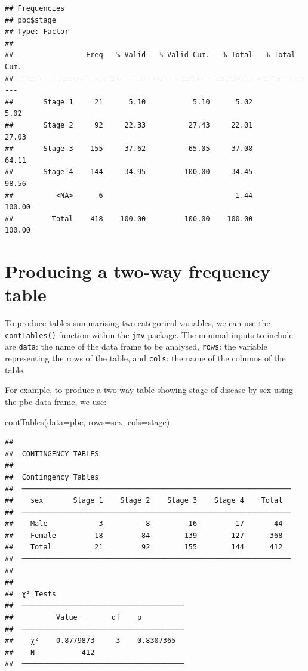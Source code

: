 \documentclass[
]{memoir}
\newenvironment{Shaded}{\begin{snugshade}}{\end{snugshade}}
\newcommand{\AttributeTok}[1]{\textcolor[rgb]{0.77,0.63,0.00}{#1}}
\newcommand{\FunctionTok}[1]{\textcolor[rgb]{0.00,0.00,0.00}{#1}}
\newcommand{\NormalTok}[1]{#1}
\begin{document}
\begin{verbatim}
## Frequencies  
## pbc$stage  
## Type: Factor  
## 
##                 Freq   % Valid   % Valid Cum.   % Total   % Total Cum.
## ------------- ------ --------- -------------- --------- --------------
##       Stage 1     21      5.10           5.10      5.02           5.02
##       Stage 2     92     22.33          27.43     22.01          27.03
##       Stage 3    155     37.62          65.05     37.08          64.11
##       Stage 4    144     34.95         100.00     34.45          98.56
##          <NA>      6                               1.44         100.00
##         Total    418    100.00         100.00    100.00         100.00
\end{verbatim}

\hypertarget{producing-a-two-way-frequency-table}{%
\section{Producing a two-way frequency table}\label{producing-a-two-way-frequency-table}}

To produce tables summarising two categorical variables, we can use the \texttt{contTables()} function within the \texttt{jmv} package. The minimal inputs to include are \texttt{data}: the name of the data frame to be analysed, \texttt{rows}: the variable representing the rows of the table, and \texttt{cols}: the name of the columns of the table.

For example, to produce a two-way table showing stage of disease by sex using the pbc data frame, we use:

\begin{Shaded}
\begin{Highlighting}[]
\FunctionTok{contTables}\NormalTok{(}\AttributeTok{data=}\NormalTok{pbc, }\AttributeTok{rows=}\NormalTok{sex, }\AttributeTok{cols=}\NormalTok{stage)}
\end{Highlighting}
\end{Shaded}

\begin{verbatim}
## 
##  CONTINGENCY TABLES
## 
##  Contingency Tables                                              
##  ─────────────────────────────────────────────────────────────── 
##    sex       Stage 1    Stage 2    Stage 3    Stage 4    Total   
##  ─────────────────────────────────────────────────────────────── 
##    Male            3          8         16         17       44   
##    Female         18         84        139        127      368   
##    Total          21         92        155        144      412   
##  ─────────────────────────────────────────────────────────────── 
## 
## 
##  χ² Tests                               
##  ────────────────────────────────────── 
##          Value        df    p           
##  ────────────────────────────────────── 
##    χ²    0.8779873     3    0.8307365   
##    N           412                      
##  ──────────────────────────────────────
\end{verbatim}
\end{document}
